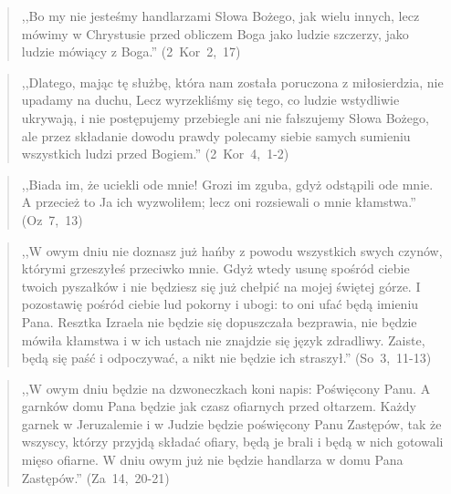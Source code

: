 \documentclass[10pt,a4paper,oneside]{article}
\begin{document}
\begin{quote}
,,Bo my nie jesteśmy handlarzami Słowa Bożego, jak wielu innych, lecz mówimy w Chrystusie przed obliczem Boga jako ludzie szczerzy, jako ludzie mówiący z Boga.'' \mbox{(2 Kor 2, 17)}
\end{quote}
\begin{quote}
,,Dlatego, mając tę służbę, która nam została poruczona z miłosierdzia, nie upadamy na duchu, Lecz wyrzekliśmy się tego, co ludzie wstydliwie ukrywają, i nie postępujemy przebiegle ani nie fałszujemy Słowa Bożego, ale przez składanie dowodu prawdy polecamy siebie samych sumieniu wszystkich ludzi przed Bogiem.'' \mbox{(2 Kor 4, 1-2)}
\end{quote}
\begin{quote}
,,Biada im, że uciekli ode mnie! Grozi im zguba, gdyż odstąpili ode mnie. A przecież to Ja ich wyzwoliłem; lecz oni rozsiewali o mnie kłamstwa.'' \mbox{(Oz 7, 13)}
\end{quote}
\begin{quote}
,,W owym dniu nie doznasz już hańby z powodu wszystkich swych czynów, którymi grzeszyłeś przeciwko mnie. Gdyż wtedy usunę spośród ciebie twoich pyszałków i nie będziesz się już chełpić na mojej świętej górze. I pozostawię pośród ciebie lud pokorny i ubogi: to oni ufać będą imieniu Pana. Resztka Izraela nie będzie się dopuszczała bezprawia, nie będzie mówiła kłamstwa i w ich ustach nie znajdzie się język zdradliwy. Zaiste, będą się paść i odpoczywać, a nikt nie będzie ich straszył.'' \mbox{(So 3, 11-13)}
\end{quote}
\begin{quote}
,,W owym dniu będzie na dzwoneczkach koni napis: Poświęcony Panu. A garnków domu Pana będzie jak czasz ofiarnych przed ołtarzem. Każdy garnek w Jeruzalemie i w Judzie będzie poświęcony Panu Zastępów, tak że wszyscy, którzy przyjdą składać ofiary, będą je brali i będą w nich gotowali mięso ofiarne. W dniu owym już nie będzie handlarza w domu Pana Zastępów.'' \mbox{(Za 14, 20-21)}
\end{quote}
\end{document}
